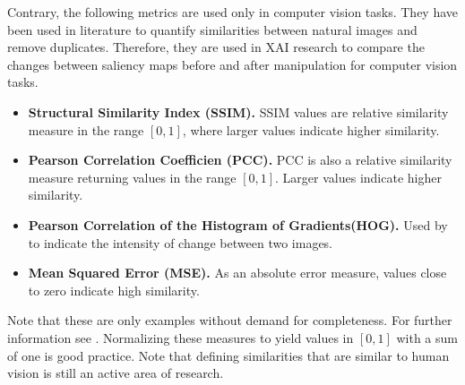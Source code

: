 Contrary, the following metrics are used only in computer vision tasks. They have been used in literature to quantify similarities between natural images and remove duplicates. Therefore, they are used in XAI research to compare the changes between saliency maps before and after manipulation for computer vision tasks.
\begin{itemize}
    \item \textbf{Structural Similarity Index (SSIM).} SSIM values are relative similarity measure in the range $\left[0, 1\right]$, where larger values indicate higher similarity.
    \item \textbf{Pearson Correlation Coefficien (PCC).} PCC is also a relative similarity measure returning values in the range $\left[0, 1\right]$. Larger values indicate higher similarity.
    \item \textbf{Pearson Correlation of the Histogram of Gradients\newline (HOG). } Used by \cite{adebayo2018sanity} to indicate the intensity of change between two images. 
    \item \textbf{Mean Squared Error (MSE).} As an absolute error measure, values close to zero indicate high similarity. 
\end{itemize}

\noindent Note that these are only examples without demand for completeness. For further information see \cite{adebayo2018sanity}.
Normalizing these measures to yield values in $\left[0, 1\right]$ with a sum of one is good practice. 
Note that defining similarities that are similar to human vision is still an active area of research. 